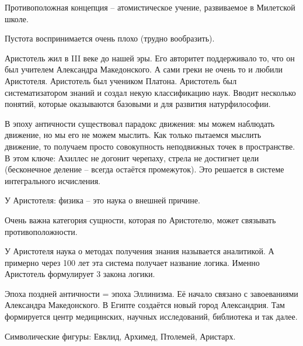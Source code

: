 \documentclass[main.tex]{subfiles}
\begin{document}
Противоположная концепция -- атомистическое учение, развиваемое в Милетской школе.

Пустота воспринимается очень плохо (трудно вообразить).



Аристотель жил в III веке до нашей эры.
Его авторитет поддерживало то, что он был учителем Александра Македонского.
А сами греки не очень то и любили Аристотеля.
Аристотель был учеником Платона.
Аристотель был систематизатором знаний и создал некую классификацию наук.
Вводит несколько понятий, которые оказываются базовыми и для развития натурфилософии.

В эпоху античности существовал парадокс движения: мы можем наблюдать движение, но мы его не можем мыслить.
Как только пытаемся мыслить движение, то получаем просто совокупность неподвижных точек в пространстве.
В этом ключе: Ахиллес не догонит черепаху, стрела не достигнет цели (бесконечное деление -- всегда остаётся промежуток).
Это решается в системе интегрального исчисления.

У Аристотеля: физика -- это наука о внешней причине.





Очень важна категория сущности, которая по Аристотелю, может связывать противоположности.

У Аристотеля наука о методах получения знания называется аналитикой.
А примерно через 100 лет эта система получает название логика.
Именно Аристотель формулирует 3 закона логики.



Эпоха поздней античности = эпоха Эллинизма.
Её начало связано с завоеваниями Александра Македонского.
В Египте создаётся новый город Александрия.
Там формируется центр медицинских, научных исследований, библиотека и так далее.

Символические фигуры: Евклид, Архимед, Птолемей, Аристарх.


\end{document}
